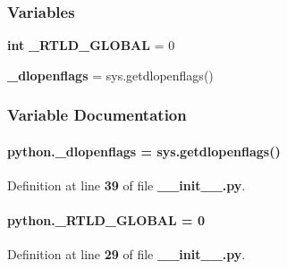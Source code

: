 \subsubsection*{Variables}
\begin{DoxyCompactItemize}
\item 
{\bf int} {\bf \+\_\+\+R\+T\+L\+D\+\_\+\+G\+L\+O\+B\+AL} = 0
\item 
{\bf \+\_\+dlopenflags} = sys.\+getdlopenflags()
\end{DoxyCompactItemize}


\subsubsection{Variable Documentation}
\paragraph[{\+\_\+dlopenflags}]{\setlength{\rightskip}{0pt plus 5cm}python.\+\_\+dlopenflags = sys.\+getdlopenflags()\hspace{0.3cm}{\ttfamily [private]}}\label{namespacepython_a656d75f8efbe53e4ed54f61ae86fb2c0}


Definition at line {\bf 39} of file {\bf \+\_\+\+\_\+init\+\_\+\+\_\+.\+py}.

\paragraph[{\+\_\+\+R\+T\+L\+D\+\_\+\+G\+L\+O\+B\+AL}]{ python.\+\_\+\+R\+T\+L\+D\+\_\+\+G\+L\+O\+B\+AL = 0\hspace{0.3cm}{\ttfamily [private]}}\label{namespacepython_ab70c5052b9b1c7c907b0dedfbb213133}


Definition at line {\bf 29} of file {\bf \+\_\+\+\_\+init\+\_\+\+\_\+.\+py}.

